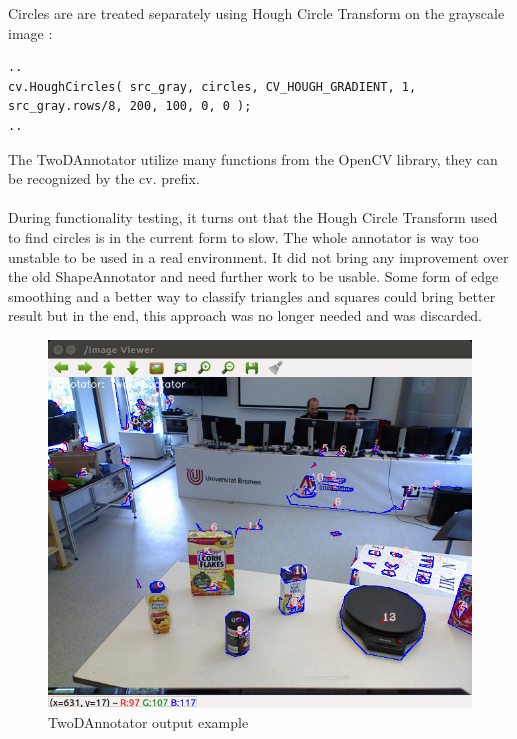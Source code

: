 \documentclass[main.tex]{subfiles}
\begin{document}
Circles are are treated separately using Hough Circle Transform on the grayscale image : 

\begin{lstlisting}
..
cv.HoughCircles( src_gray, circles, CV_HOUGH_GRADIENT, 1, src_gray.rows/8, 200, 100, 0, 0 );
..
\end{lstlisting}

The TwoDAnnotator utilize many functions from the OpenCV library, they can be recognized by the cv. prefix. \\ \\
During functionality testing, it turns out that the Hough Circle Transform used to find circles is in the current form to slow. The whole annotator is way too unstable to be used in a real environment. It did not bring any improvement over the old ShapeAnnotator and need further work to be usable. Some form of edge smoothing and a better way to classify triangles and squares could bring better result but in the end, this approach was no longer needed and was discarded.
\begin{figure}[H]
\centering
\includegraphics[width=1\textwidth]{pictures/perception/TwoDAnnotator.png}
\caption{TwoDAnnotator output example}
\end{figure}
\end{document}
